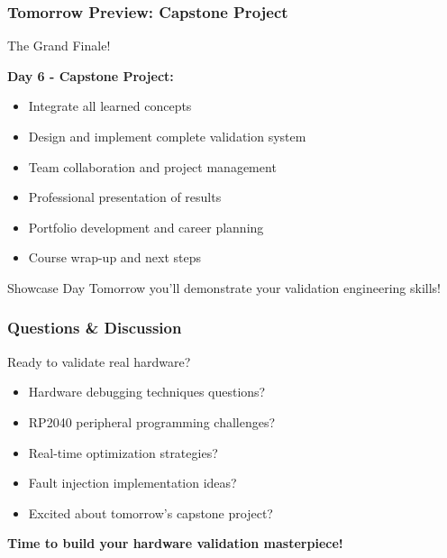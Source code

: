 \documentclass{beamer}
\begin{document}
\begin{frame}
\frametitle{Tomorrow Preview: Capstone Project}
\begin{center}
\Large The Grand Finale!
\end{center}

\textbf{Day 6 - Capstone Project:}
\begin{itemize}
    \item Integrate all learned concepts
    \item Design and implement complete validation system
    \item Team collaboration and project management
    \item Professional presentation of results
    \item Portfolio development and career planning
    \item Course wrap-up and next steps
\end{itemize}

\vspace{0.5cm}
\begin{alertblock}{Showcase Day}
Tomorrow you'll demonstrate your validation engineering skills!
\end{alertblock}
\end{frame}

\begin{frame}
\frametitle{Questions \& Discussion}
\begin{center}
\Large Ready to validate real hardware?
\end{center}

\begin{itemize}
    \item Hardware debugging techniques questions?
    \item RP2040 peripheral programming challenges?
    \item Real-time optimization strategies?
    \item Fault injection implementation ideas?
    \item Excited about tomorrow's capstone project?
\end{itemize}

\vspace{1cm}
\begin{center}
\textbf{Time to build your hardware validation masterpiece!}
\end{center}
\end{frame}
\end{document}
